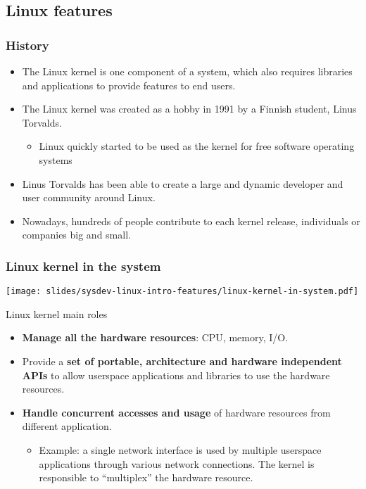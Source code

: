 \subsection{Linux features}

\begin{frame}
  \frametitle{History}
  \begin{itemize}
  \item The Linux kernel is one component of a system, which also
    requires libraries and applications to provide features to end
    users.
  \item The Linux kernel was created as a hobby in 1991 by a Finnish
    student, Linus Torvalds.
    \begin{itemize}
    \item Linux quickly started to be used as the kernel for free
      software operating systems
    \end{itemize}
  \item Linus Torvalds has been able to create a large and dynamic
    developer and user community around Linux.
  \item Nowadays, hundreds of people contribute to each kernel
    release, individuals or companies big and small.
  \end{itemize}
\end{frame}

\begin{frame}
  \frametitle{Linux kernel in the system}
  \begin{center}
    \texttt{[image: slides/sysdev-linux-intro-features/linux-kernel-in-system.pdf]}
  \end{center}
\end{frame}

\begin{frame}{Linux kernel main roles}
  \begin{itemize}
  \item {\bf Manage all the hardware resources}: CPU, memory, I/O.
  \item Provide a {\bf set of portable, architecture and hardware
      independent APIs} to allow userspace applications and libraries
    to use the hardware resources.
  \item {\bf Handle concurrent accesses and usage} of hardware
    resources from different application.
    \begin{itemize}
    \item Example: a single network interface is used by multiple
      userspace applications through various network connections. The
      kernel is responsible to ``multiplex'' the hardware resource.
    \end{itemize}
  \end{itemize}
\end{frame}

